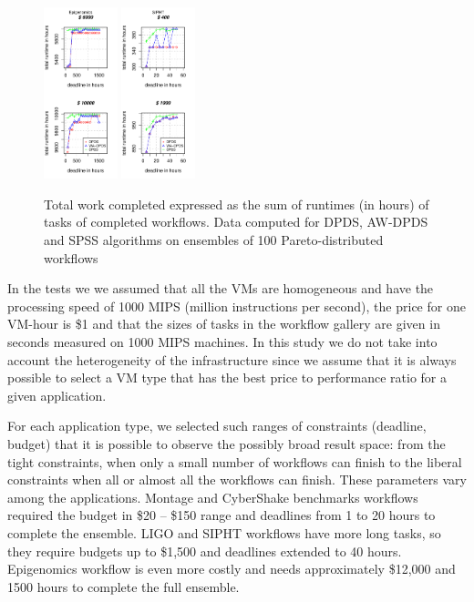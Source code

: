 \documentclass{sig-alternate}
\begin{document}
\begin{figure}[t]
\includegraphics[width=0.19\textwidth]{figures/pareto-size-GENOME-n-1000-8-dagh100-1500m0.pdf}
\includegraphics[width=0.19\textwidth]{figures/pareto-size-SIPHT-n-1000-8-dagh5-50m0.pdf}
\caption{ Total work completed expressed as the sum of runtimes (in hours) of
tasks of completed workflows. Data computed for DPDS, AW-DPDS and SPSS
algorithms on ensembles of 100 Pareto-distributed workflows}
\label{fig:total-time}
\end{figure}


In the tests we we assumed that all the VMs are homogeneous and have the
processing speed of 1000 MIPS (million instructions per second), the price for
one VM-hour is \$1 and that the sizes of tasks in the workflow gallery are given
in seconds measured on 1000 MIPS machines. In this study we do not take into
account the heterogeneity of the infrastructure since we assume that it is
always possible to select a VM type that has the best price to performance ratio
for a given application.

For each application type, we selected such ranges of constraints (deadline,
budget) that it is possible to observe the possibly broad result space: from the
tight constraints, when only a small number of workflows can finish to the
liberal constraints when all or almost all the workflows can finish. These
parameters vary among the applications. Montage and CyberShake benchmarks
workflows required the budget in \$20 -- \$150 range and deadlines from 1 to
20 hours to complete the ensemble. LIGO and SIPHT workflows have more long
tasks, so they require budgets up to \$1,500 and deadlines extended to 40
hours. Epigenomics workflow is even more costly and needs approximately \$12,000
and 1500 hours to complete the full ensemble.
\end{document}
